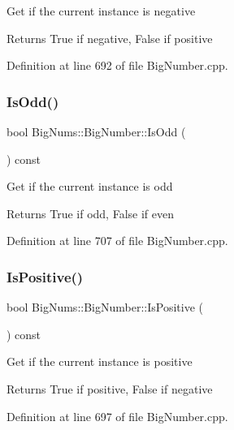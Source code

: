 Get if the current instance is negative \begin{DoxyReturn}{Returns}
True if negative, False if positive 
\end{DoxyReturn}


Definition at line 692 of file Big\+Number.\+cpp.

\mbox{\label{class_big_nums_1_1_big_number_afa4fe9880b4c307cd12ebbdbe94c28d2}} 
\subsubsection{\texorpdfstring{IsOdd()}{IsOdd()}}
{\footnotesize\ttfamily bool Big\+Nums\+::\+Big\+Number\+::\+Is\+Odd (\begin{DoxyParamCaption}{ }\end{DoxyParamCaption}) const}

Get if the current instance is odd \begin{DoxyReturn}{Returns}
True if odd, False if even 
\end{DoxyReturn}


Definition at line 707 of file Big\+Number.\+cpp.

\mbox{\label{class_big_nums_1_1_big_number_a8d1479eed46930fdcd374c85881c2864}} 
\subsubsection{\texorpdfstring{IsPositive()}{IsPositive()}}
{\footnotesize\ttfamily bool Big\+Nums\+::\+Big\+Number\+::\+Is\+Positive (\begin{DoxyParamCaption}{ }\end{DoxyParamCaption}) const}

Get if the current instance is positive \begin{DoxyReturn}{Returns}
True if positive, False if negative 
\end{DoxyReturn}


Definition at line 697 of file Big\+Number.\+cpp.

\mbox{\label{class_big_nums_1_1_big_number_a1d7839794fa1b9dd285e017443d1859a}} 
